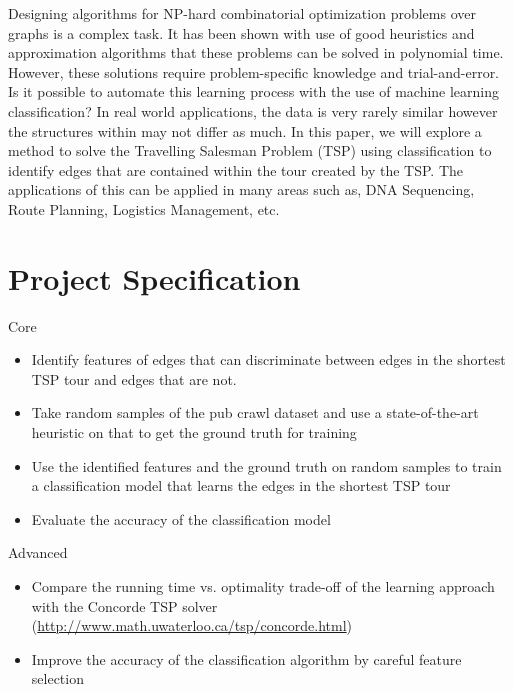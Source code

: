 \documentclass[]{UCD_CS_FYP_Report}
\begin{document}
\maketitle


\tableofcontents


\abstract
Designing algorithms for NP-hard combinatorial optimization problems over graphs is a complex task. It has been shown with use of good heuristics and approximation algorithms that these problems can be solved in polynomial time. However, these solutions require problem-specific knowledge and trial-and-error. Is it possible to automate this learning process with the use of machine learning classification? In real world applications, the data is very rarely similar however the structures within may not differ as much. In this paper, we will explore a method to solve the Travelling Salesman Problem (TSP) using classification to identify edges that are contained within the tour created by the TSP. The applications of this can be applied in many areas such as, DNA Sequencing, Route Planning, Logistics Management, etc.


\chapter{Project Specification}
\LARGE Core
\normalsize
\begin{itemize}
    \item Identify features of edges that can discriminate between edges in the shortest TSP tour and edges that are not.
    \item Take random samples of the pub crawl dataset and use a state-of-the-art heuristic on that to get the ground truth for training
    \item Use the identified features and the ground truth on random samples to train a classification model that learns the edges in the shortest TSP tour
    \item Evaluate the accuracy of the classification model
\end{itemize}
\LARGE Advanced
\normalsize
\begin{itemize}
    \item Compare the running time vs. optimality trade-off of the learning approach with the Concorde TSP solver (\url{http://www.math.uwaterloo.ca/tsp/concorde.html})
    \item Improve the accuracy of the classification algorithm by careful feature selection
\end{itemize}
\end{document}
